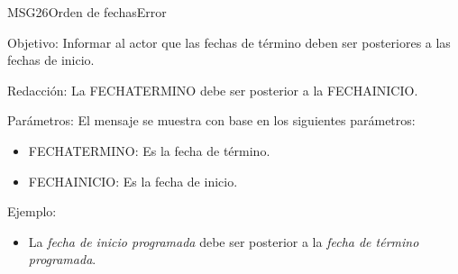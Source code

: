 \begin{mensaje}{MSG26}{Orden de fechas}{Error}
	\item [Objetivo:] Informar al actor que las fechas de término deben ser posteriores a las fechas de inicio.
	\item[Redacción:] La FECHATERMINO debe ser posterior a la FECHAINICIO.
	\item[Parámetros:] El mensaje se muestra con base en los siguientes parámetros:
	\begin{itemize}
		\item FECHATERMINO: Es la fecha de término.
		\item FECHAINICIO: Es la fecha de inicio.
	\end{itemize}
\item[Ejemplo:] \begin{itemize}
	\item La { \em fecha de inicio programada} debe ser posterior a la {\em fecha de término programada}.
\end{itemize}
\end{mensaje}